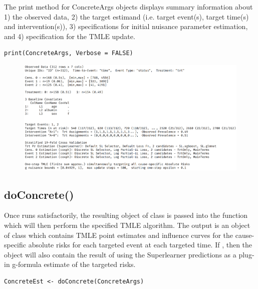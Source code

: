 \documentclass{report}
\newcommand{\1}{\ensuremath{\mathbf{1}}}
\begin{document}
The print method for ConcreteArgs objects displays summary information about 1) the observed data, 2) the target estimand (i.e. target event(s), target time(s) and intervention(s)), 3) specifications for initial nuisance parameter estimation, and 4) specification for the TMLE update. 

\begin{lstlisting}
print(ConcreteArgs, Verbose = FALSE)
\end{lstlisting}

\begin{figure}[H]
\includegraphics[width=\linewidth]{fig/ConcreteArgs.png}
\end{figure}

\subsection{doConcrete()}
\label{doConcrete}
Once  runs satisfactorily, the resulting object of class  is passed into the  function which will then perform the specified TMLE algorithm. The output is an object of class  which contains TMLE point estimates and influence curves for the cause-specific absolute risks for each targeted event at each targeted time. If , then the  object will also contain the result of using the Superlearner predictions as a plug-in g-formula estimate of the targeted risks. 

\begin{lstlisting}
ConcreteEst <- doConcrete(ConcreteArgs)
\end{lstlisting}
\end{document}
